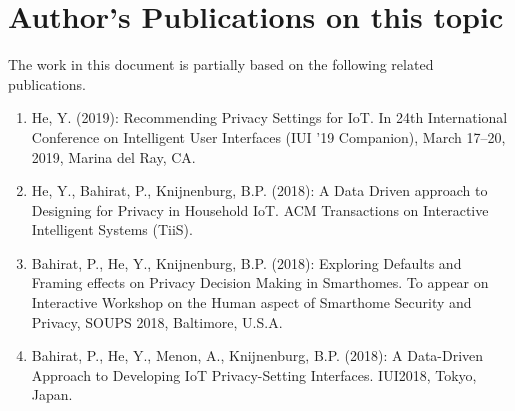 \chapter{Author's Publications on this topic}
\noindent The work in this document is partially based on the following related publications.
\begin{enumerate}
	\item He, Y. (2019): Recommending Privacy Settings for IoT. In 24th International Conference on Intelligent User Interfaces (IUI ’19 Companion), March 17–20, 2019, Marina del Ray, CA.
	
	\item He, Y., Bahirat, P., Knijnenburg, B.P. (2018): A Data Driven approach to Designing for Privacy in Household IoT. ACM Transactions on Interactive Intelligent Systems (TiiS).
	
	\item Bahirat, P., He, Y., Knijnenburg, B.P. (2018): Exploring Defaults and Framing effects on Privacy Decision Making in Smarthomes.  To appear on Interactive Workshop on the Human aspect of Smarthome Security and Privacy, SOUPS 2018, Baltimore, U.S.A.
	\item Bahirat, P., He, Y., Menon, A., Knijnenburg, B.P. (2018): A Data-Driven Approach to Developing IoT Privacy-Setting Interfaces. IUI2018, Tokyo, Japan.
%	
\end{enumerate}